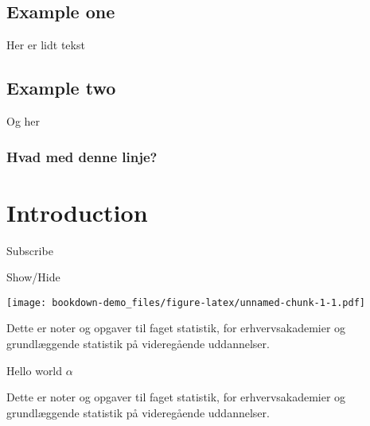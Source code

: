 \documentclass[]{book}
\newenvironment{Shaded}{\begin{snugshade}}{\end{snugshade}}
\newcommand{\KeywordTok}[1]{\textcolor[rgb]{0.13,0.29,0.53}{\textbf{#1}}}
\newcommand{\NormalTok}[1]{#1}
\newcommand{\OperatorTok}[1]{\textcolor[rgb]{0.81,0.36,0.00}{\textbf{#1}}}
\theoremstyle{definition}
\theoremstyle{definition}
\theoremstyle{definition}
\theoremstyle{remark}
\begin{document}
\hypertarget{example-one-1}{%
\section{Example one}\label{example-one-1}}

Her er lidt tekst

\hypertarget{example-two-1}{%
\section{Example two}\label{example-two-1}}

Og her

\hypertarget{hvad-med-denne-linje}{%
\subsection{Hvad med denne linje?}\label{hvad-med-denne-linje}}

\hypertarget{intro}{%
\chapter{Introduction}\label{intro}}

Subscribe

Show/Hide

\hypertarget{BlockName}{}
\begin{Shaded}
\end{Shaded}

\texttt{[image: bookdown-demo\_files/figure-latex/unnamed-chunk-1-1.pdf]}

Dette er noter og opgaver til faget statistik, for erhvervsakademier og
grundlæggende statistik på videregående uddannelser.

\leavevmode\hypertarget{BlockName3}{}%
Hello world \(\alpha\)

Dette er noter og opgaver til faget statistik, for erhvervsakademier og
grundlæggende statistik på videregående uddannelser.
\end{document}
